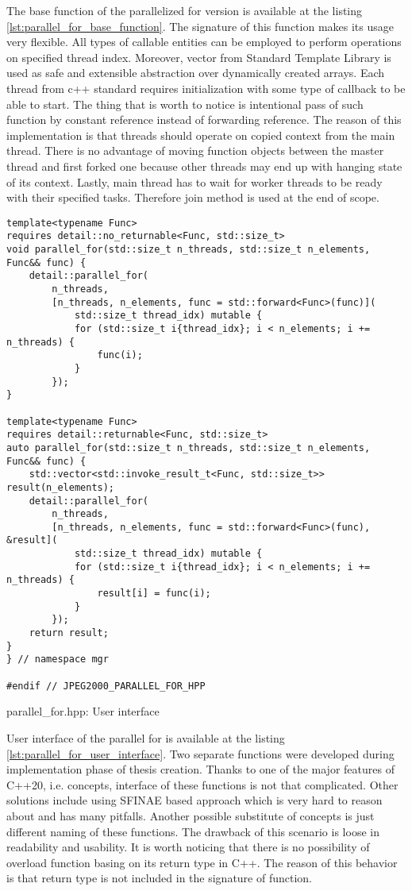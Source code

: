 The base function of the parallelized for version is available at the listing \ref{lst:parallel_for_base_function}.
The signature of this function makes its usage very flexible. All types of callable entities
can be employed to perform operations on specified thread index. Moreover, vector from Standard
Template Library is used as safe and extensible abstraction over dynamically created arrays.
Each thread from c++ standard requires initialization with some type of callback to
be able to start. The thing that is worth to notice is intentional pass of such function by
constant reference instead of forwarding reference. The reason of this implementation is that
threads should operate on copied context from the main thread. There is no advantage of moving
function objects between the master thread and first forked one because other threads may
end up with hanging state of its context. Lastly, main thread has to wait for worker threads
to be ready with their specified tasks. Therefore join method is used at the end of scope.


\begin{listing}[htb]
\begin{verbatim}
template<typename Func>
requires detail::no_returnable<Func, std::size_t>
void parallel_for(std::size_t n_threads, std::size_t n_elements, Func&& func) {
    detail::parallel_for(
        n_threads,
        [n_threads, n_elements, func = std::forward<Func>(func)](
            std::size_t thread_idx) mutable {
            for (std::size_t i{thread_idx}; i < n_elements; i += n_threads) {
                func(i);
            }
        });
}

template<typename Func>
requires detail::returnable<Func, std::size_t>
auto parallel_for(std::size_t n_threads, std::size_t n_elements, Func&& func) {
    std::vector<std::invoke_result_t<Func, std::size_t>> result(n_elements);
    detail::parallel_for(
        n_threads,
        [n_threads, n_elements, func = std::forward<Func>(func), &result](
            std::size_t thread_idx) mutable {
            for (std::size_t i{thread_idx}; i < n_elements; i += n_threads) {
                result[i] = func(i);
            }
        });
    return result;
}
} // namespace mgr

#endif // JPEG2000_PARALLEL_FOR_HPP
\end{verbatim}
\caption{parallel\_for.hpp: User interface}
\label{lst:parallel_for_user_interface}
\end{listing}

User interface of the parallel for is available at the listing \ref{lst:parallel_for_user_interface}.
Two separate functions were developed during implementation phase of thesis creation.
Thanks to one of the major features of C++20, i.e. concepts, interface of these functions
is not that complicated. Other solutions include using SFINAE based approach which is very
hard to reason about and has many pitfalls. Another possible substitute of concepts is just
different naming of these functions. The drawback of this scenario is loose in readability
and usability. It is worth noticing that there is no possibility of overload function basing
on its return type in C++. The reason of this behavior is that return type is not included
in the signature of function.


